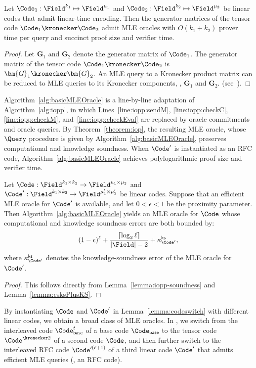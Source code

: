 \begin{corollary}
\label{corollary:mleGeneratorInterleave}
Let $\Code_1: \Field^{k_1} \mapsto \Field^{\mu_1}$ and $\Code_2: \Field^{k_2} \mapsto \Field^{\mu_2}$ be linear codes that admit
linear-time encoding.
Then the generator matrices of the tensor code $\Code_1 \kronecker \Code_2$ admit MLE oracles with
$O(k_1+k_2)$ prover time per query and succinct proof size and verifier time.
\end{corollary}

\begin{proof}
Let $\bm{G}_1$ and $\bm{G}_2$ denote the generator matrix of $\Code_1$.
The generator matrix of the tensor code $\Code_1 \kronecker \Code_2$
is $\bm{G}_1 \kronecker \bm{G}_2$.
An MLE query to a Kronecker product matrix can be reduced to MLE queries
to its Kronecker components, \ie, $\bm{G}_1$ and $\bm{G}_2$. (see~\cite[Section~5.2]{asiacrypt/CCYY25}).
\end{proof}


Algorithm~\ref{alg:basicMLEOracle} is a line-by-line adaptation of Algorithm~\ref{alg:iopp}, in which Lines~\ref{line:iopp:sendM}, \ref{line:iopp:checkC}, \ref{line:iopp:checkM}, and~\ref{line:iopp:checkEval} are replaced by oracle commitments and oracle queries.
By Theorem~\ref{theorem:iop}, the resulting MLE oracle,
whose $\Query$ procedure is given by Algorithm~\ref{alg:basicMLEOracle},
preserves computational and knowledge soundness.
When $\Code'$ is instantiated as an RFC code, Algorithm~\ref{alg:basicMLEOracle} achieves polylogarithmic proof size and verifier time.

\begin{lemma}
\label{lemma:codeswitch}
Let
$\Code:\Field^{k_1\times k_2}\to\Field^{\mu_1\times\mu_2}$
and
$\Code':\Field^{k_1\times k_2}\to\Field^{\mu_1'\times\mu_2'}$
be linear codes.
Suppose that an efficient MLE oracle for $\Code'$ is available, and let
$0<\epsilon<1$ be the proximity parameter.
Then Algorithm~\ref{alg:basicMLEOracle} yields an MLE oracle for $\Code$ whose
computational and knowledge soundness errors are both bounded by:
\[
(1-\epsilon)^{\ell}
+
\frac{\lceil \log_2 \ell \rceil}{|\Field|-2}
+
\kappa_{\Code'}^{\mathsf{ks}},
\]
where $\kappa_{\Code'}^{\mathsf{ks}}$ denotes the knowledge-soundness error of the
MLE oracle for $\Code'$.
\end{lemma}

\begin{proof}
This follows directly from Lemma~\ref{lemma:iopp-soundness} and
Lemma~\ref{lemma:csksPlusKS}.
\end{proof}

By instantiating $\Code$ and $\Code'$ in Lemma~\ref{lemma:codeswitch} with different
linear codes, we obtain a broad class of MLE oracles.
In \methodname, we switch from the interleaved code
$\Code_{\mathsf{base}}^{t}$ of a base code $\Code_{\mathsf{base}}$
to the tensor code $\Code^{\kronecker 2}$ of a second code $\Code$,
and then further switch to the interleaved RFC code
$\Code'^{(\ell+1)}$ of a third linear code $\Code'$
that admits efficient MLE queries (\eg, an RFC code).
